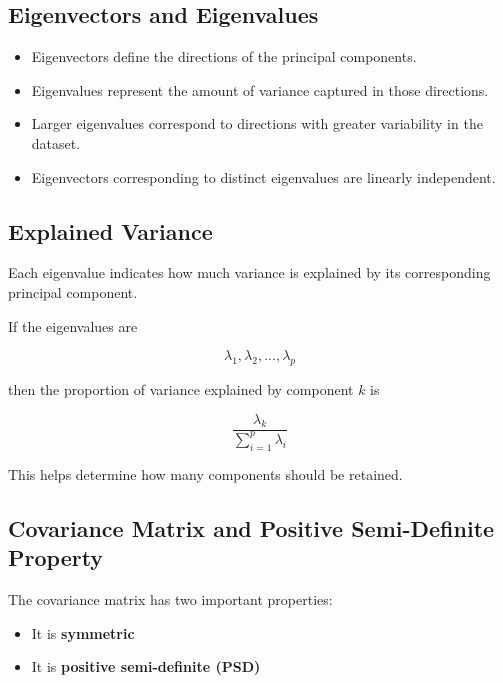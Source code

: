 \documentclass[10pt,a4paper]{article}
\begin{document}
	\subsection{Eigenvectors and Eigenvalues}

	\begin{itemize}

		\item Eigenvectors define the directions of the principal components.

		\item Eigenvalues represent the amount of variance captured in those directions.

		\item Larger eigenvalues correspond to directions with greater variability in the dataset.

		\item Eigenvectors corresponding to distinct eigenvalues are linearly independent.

	\end{itemize}

	\subsection{Explained Variance}

	Each eigenvalue indicates how much variance is explained by its corresponding principal component.

	If the eigenvalues are

	\[
	\lambda_1, \lambda_2, ..., \lambda_p
	\]

	then the proportion of variance explained by component $k$ is

	\[
	\frac{\lambda_k}{\sum_{i=1}^{p}\lambda_i}
	\]

	This helps determine how many components should be retained.


	\subsection{Covariance Matrix and Positive Semi-Definite Property}

	The covariance matrix has two important properties:

	\begin{itemize}
		\item It is \textbf{symmetric}
		\item It is \textbf{positive semi-definite (PSD)}
	\end{itemize}
\end{document}
